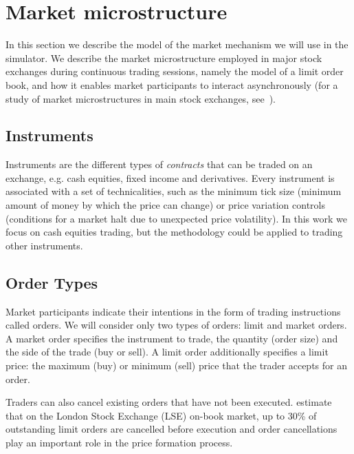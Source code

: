 \section{Market microstructure}
\label{Chapters/Background/Market-Microstructure}

In this section we describe the model of the market mechanism we will use in the simulator. We describe the market microstructure employed in major stock exchanges during continuous trading sessions, namely the model of a limit order book, and how it enables market participants to interact asynchronously (for a study of market microstructures in main stock exchanges, see~\cite{Comerton2004}). 


\subsection{Instruments}
Instruments are the different types of \textit{contracts} that can be traded on an exchange, e.g. cash equities, fixed income and derivatives. Every instrument is associated with a set of technicalities, such as the minimum tick size (minimum amount of money by which the price can change) or price variation controls (conditions for a market halt due to unexpected price volatility). In this work we focus on cash equities trading, but the methodology could be applied to trading other instruments.

\subsection{Order Types}
\label{Chapters/Background/Order-Types}
Market participants indicate their intentions in the form of trading instructions called orders. We will consider only two types of orders: limit and market orders. A market order specifies the instrument to trade, the quantity (order size) and the side of the trade (buy or sell). A limit order additionally specifies a limit price: the maximum (buy) or minimum (sell) price that the trader accepts for an order. 

Traders can also cancel existing orders that have not been executed. \citet{Lilo2004} estimate that on the London Stock Exchange (LSE) on-book market, up to 30\% of outstanding limit orders are cancelled before execution and order cancellations play an important role in the price formation process. 

